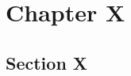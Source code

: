 \documentclass[../main.tex]{subfiles}
\begin{document}
\chapter{Chapter X}

\lipsum[1-5]

\section{Section X}

\lipsum[1-5]
\end{document}
